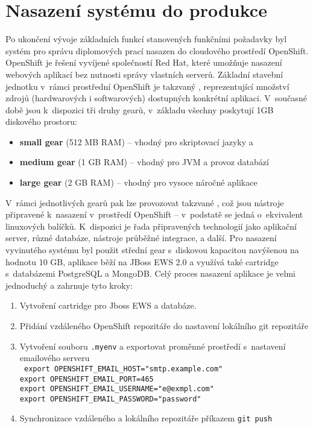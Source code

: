\chapter{Nasazení systému do produkce}
Po ukončení vývoje základních funkcí stanovených funkčními požadavky byl systém pro správu diplomových prací nasazen do cloudového prostředí OpenShift. OpenShift je  řešení vyvíjené společností Red Hat, které umožňuje nasazení webových aplikací bez nutnosti správy vlastních serverů. Základní stavební jednotku v~rámci prostřední OpenShift je takzvaný , reprezentující množství zdrojů (hardwarových i softwarových) dostupných konkrétní aplikaci. V~současné době jsou k~dispozici tři druhy gearů, v~základu všechny poskytují 1GB diskového prostoru:

\begin{itemize}
\item \textbf{small gear} (512 MB RAM) -- vhodný pro skriptovací jazyky a
\item \textbf{medium gear} (1 GB RAM) -- vhodný pro JVM a provoz databází
\item \textbf{large gear} (2 GB RAM)  -- vhodný pro vysoce náročné aplikace
\end{itemize}

V~rámci jednotlivých gearů pak lze provozovat takzvané , což jsou nástroje připravené k~nasazení v~prostředí OpenShift -- v~podstatě se jedná o~ekvivalent linuxových balíčků. K~dispozici je řada připravených technologií jako aplikační server, různé databáze, nástroje průběžné integrace, a další. Pro nasazení vyvinutého systému byl použit střední gear s~diskovou kapacitou navýšenou na hodnotu 10 GB, aplikace běží na JBoss EWS 2.0 a využívá také cartridge s~databázemi PostgreSQL a MongoDB. Celý proces nasazení aplikace je velmi jednoduchý a zahrnuje tyto kroky:

\begin{enumerate}
\item Vytvoření cartridge pro Jboss EWS a databáze.
\item Přidání vzdáleného OpenShift repozitáře do nastavení lokálního git repozitáře
\item Vytvoření souboru \texttt{.myenv} a exportovat proměnné prostředí s~nastavení emailového serveru \\
\texttt{
export OPENSHIFT\_EMAIL\_HOST="smtp.example.com"\\
export OPENSHIFT\_EMAIL\_PORT=465\\
export OPENSHIFT\_EMAIL\_USERNAME="e@exmpl.com"\\
export OPENSHIFT\_EMAIL\_PASSWORD="password"\\
}
\item Synchronizace vzdáleného a lokálního repozitáře příkazem \texttt{git push}
\end{enumerate}

